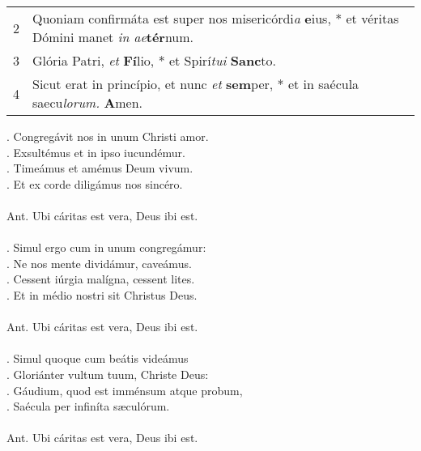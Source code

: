 \documentclass[12pt, a5paper]{book}
\begin{document}


\par
\begin{tabular}{ll}
2&Quoniam confirm\'ata est super nos miseric\'ordi{\it a} {\bf e}ius, * et véritas Dómini manet {\it in ae}{\bf tér}num.\\
3&Glória Patri, {\it et} {\bf Fí}lio, * et Spirí{\it tui} {\bf Sanc}to.\\
4&Sicut erat in princípio, et nunc {\it et} {\bf sem}per, * et in saécula saecu{\it lorum.} {\bf A}men.\\
\end{tabular}




\Vbar . Congregávit nos in unum Christi amor.\\
\Vbar . Exsultémus et in ipso iucundémur.\\
\Vbar . Timeámus et amémus Deum vivum.\\
\Vbar . Et ex corde diligámus nos sincéro.\\
\\
Ant. Ubi cáritas est vera, Deus ibi est.\\
\\
\Vbar . Simul ergo cum in unum congregámur:\\
\Vbar . Ne nos mente dividámur, caveámus.\\
\Vbar . Cessent iúrgia malígna, cessent lites.\\
\Vbar . Et in médio nostri sit Christus Deus.\\
\\
Ant. Ubi cáritas est vera, Deus ibi est.\\
\\
\Vbar . Simul quoque cum beátis videámus\\
\Vbar . Gloriánter vultum tuum, Christe Deus:\\
\Vbar . Gáudium, quod est imménsum atque probum,\\
\Vbar . Saécula per infiníta s\ae culórum.\\
\\
Ant. Ubi cáritas est vera, Deus ibi est.\\

\end{document}
